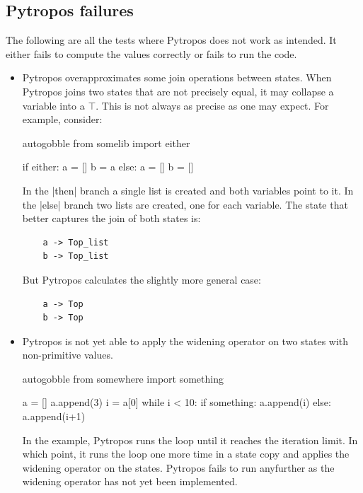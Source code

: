 \subsection*{Pytropos failures}

The following are all the tests where Pytropos does not work as intended. It either fails to compute the values correctly or fails to run the code.

\begin{itemize}

\item Pytropos overapproximates some join operations between states.
  When Pytropos joins two states that are not precisely equal, it may collapse a
  variable into a $\top$. This is not always as precise as one may expect. For example,
  consider:

  \begin{pythoncode*}{autogobble}
    from somelib import either

    if either:
        a = []
        b = a
    else:
        a = []
        b = []
  \end{pythoncode*}

  In the \pycode|then| branch a single list is created and both variables point to it.
  In the \pycode|else| branch two lists are created, one for each variable. The state that
  better captures the join of both states is:

  \begin{verbatim}
    a -> Top_list
    b -> Top_list
  \end{verbatim}

  But Pytropos calculates the slightly more general case:

  \begin{verbatim}
    a -> Top
    b -> Top
  \end{verbatim}

\item Pytropos is not yet able to apply the widening operator on two states with
  non-primitive values.

  \begin{pythoncode*}{autogobble}
     from somewhere import something

     a = []
     a.append(3)
     i = a[0]
     while i < 10:
         if something:
             a.append(i)
         else:
             a.append(i+1)
  \end{pythoncode*}

  In the example, Pytropos runs the loop until it reaches the iteration limit. In which
  point, it runs the loop one more time in a state copy and applies the widening operator
  on the states. Pytropos fails to run anyfurther as the widening operator has not yet
  been implemented.


\end{itemize}
